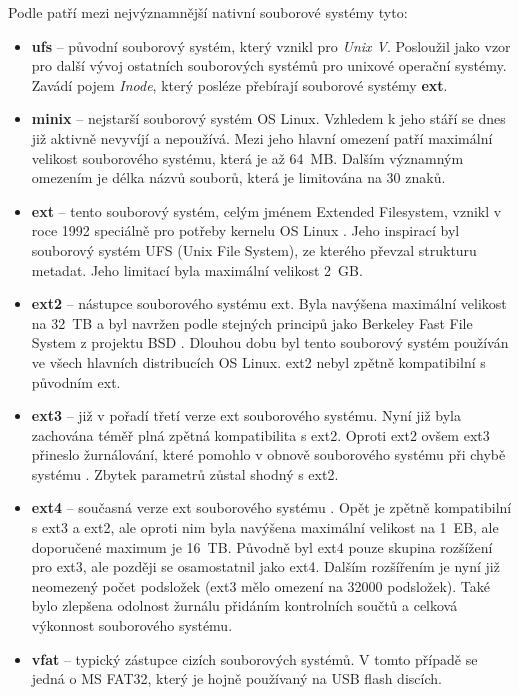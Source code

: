 Podle \cite{tldp-filesystem} patří mezi nejvýznamnější nativní souborové systémy tyto:
\begin{itemize}
    \item \textbf{ufs} -- původní souborový systém, který vznikl pro \textit{Unix V}. Posloužil jako vzor pro další vývoj ostatních souborových systémů pro unixové operační systémy. Zavádí pojem \textit{Inode}, který posléze přebírají souborové systémy \textbf{ext}.
    \item \textbf{minix} -- nejstarší souborový systém OS Linux. Vzhledem k jeho stáří se dnes již aktivně nevyvíjí a nepoužívá. Mezi jeho hlavní omezení patří maximální velikost souborového systému, která je až 64~MB. Dalším významným omezením je délka názvů souborů, která je limitována na 30 znaků.
    \item \textbf{ext} -- tento souborový systém, celým jménem Extended Filesystem, vznikl v roce 1992 speciálně pro potřeby kernelu OS Linux \cite{linmag-ext}. Jeho inspirací byl souborový systém UFS (Unix File System), ze kterého převzal strukturu metadat. Jeho limitací byla maximální velikost 2~GB.
    \item \textbf{ext2} -- nástupce souborového systému ext. Byla navýšena maximální velikost na 32~TB a byl navržen podle stejných principů jako Berkeley Fast File System z projektu BSD \cite{nongnu-ext2}. Dlouhou dobu byl tento souborový systém používán ve všech hlavních distribucích OS Linux. ext2 nebyl zpětně kompatibilní s původním ext.
    \item \textbf{ext3} -- již v pořadí třetí verze ext souborového systému. Nyní již byla zachována téměř plná zpětná kompatibilita s ext2. Oproti ext2 ovšem ext3 přineslo žurnálování, které pomohlo v obnově souborového systému při chybě systému \cite{paper-ext3}. Zbytek parametrů zůstal shodný s ext2.
    \item \textbf{ext4} -- současná verze ext souborového systému \cite{paper-ext4}. Opět je zpětně kompatibilní s ext3 a ext2, ale oproti nim byla navýšena maximální velikost na 1~EB, ale doporučené maximum je 16~TB. Původně byl ext4 pouze skupina rozšížení pro ext3, ale později se osamostatnil jako ext4. Dalším rozšířením je nyní již neomezený počet podsložek (ext3 mělo omezení na 32000 podsložek). Také bylo zlepšena odolnost žurnálu přidáním kontrolních součtů a celková výkonnost souborového systému.
    \item \textbf{vfat} -- typický zástupce cizích souborových systémů. V tomto případě se jedná o MS FAT32, který je hojně používaný na USB flash discích.

\end{itemize}
